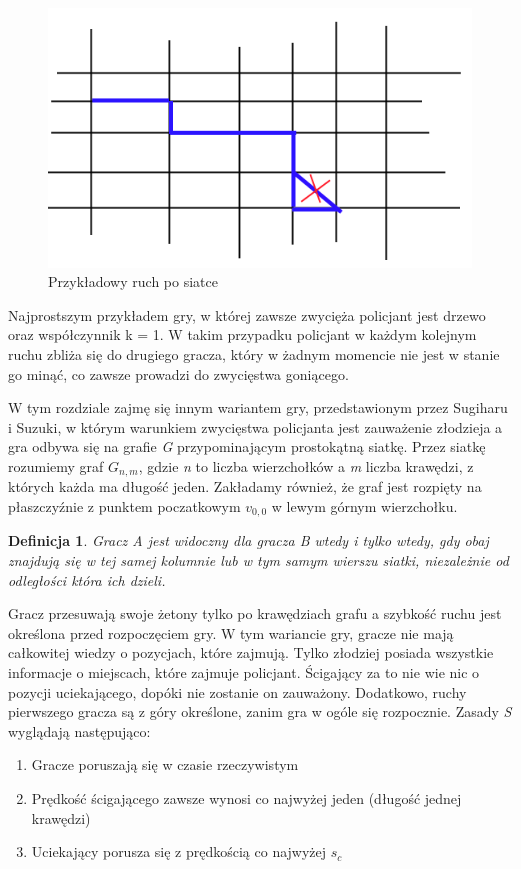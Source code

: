 \documentclass[brudnopis]{xmgr}
\newtheorem{Definicja}{Definicja}
\begin{document}
\begin{figure}[ht!]
  \centering
  \includegraphics{rysunki/przykladowy_ruch.png}
  \caption{Przykładowy ruch po siatce}
\end{figure} 
Najprostszym przykładem gry, w której zawsze zwycięża policjant jest drzewo oraz współczynnik k = 1. W takim przypadku policjant w każdym kolejnym ruchu zbliża się do drugiego gracza, który w żadnym momencie nie jest w stanie go minąć, co zawsze prowadzi do zwycięstwa goniącego.

W tym rozdziale zajmę się innym wariantem gry, przedstawionym przez Sugiharu i Suzuki, w którym warunkiem zwycięstwa policjanta jest zauważenie złodzieja a gra odbywa się na grafie \textit{G} przypominającym prostokątną siatkę.
Przez siatkę rozumiemy graf \textit{$G_{n,m}$}, gdzie \textit{n} to liczba wierzchołków a \textit{m} liczba krawędzi, z których każda ma długość jeden. Zakładamy również, że graf jest rozpięty na płaszczyźnie z punktem poczatkowym \textit{$v_{0,0}$} w lewym górnym wierzchołku.
\begin{Definicja}
  Gracz A \textnormal{jest widoczny} dla gracza B wtedy i tylko wtedy, gdy obaj znajdują się w tej samej kolumnie lub w tym samym wierszu siatki, niezależnie od odległości która ich dzieli.
\end{Definicja}

Gracz przesuwają swoje żetony tylko po krawędziach grafu a szybkość ruchu jest określona przed rozpoczęciem gry.
W tym wariancie gry, gracze nie mają całkowitej wiedzy o pozycjach, które zajmują. Tylko złodziej posiada wszystkie informacje o miejscach, które zajmuje policjant. Ścigający za to nie wie nic o pozycji uciekającego, dopóki nie zostanie on zauważony. Dodatkowo, ruchy pierwszego gracza są z góry określone, zanim gra w ogóle się rozpocznie.
Zasady \textit{S} wyglądają następująco:
\begin{enumerate}
  \item Gracze poruszają się w czasie rzeczywistym
  \item Prędkość ścigającego zawsze wynosi co najwyżej jeden (długość jednej krawędzi)
  \item Uciekający porusza się z prędkością co najwyżej $s_c$
\end{enumerate}
\end{document}
